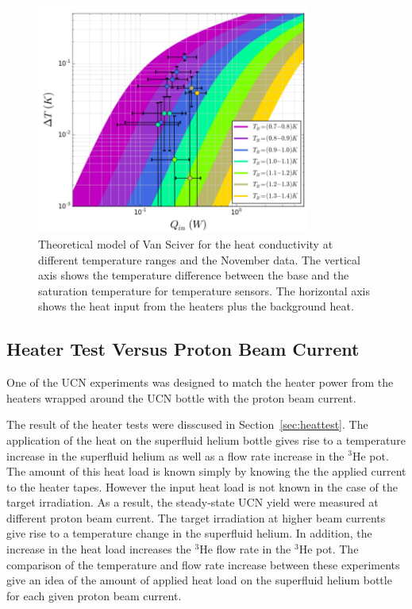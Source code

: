 \begin{figure}[h!]
  \centering \includegraphics[width=0.8\textwidth]{November_Data.png}
  \caption{Theoretical model of Van Sciver for the heat conductivity
    at different temperature ranges and the November data. The
    vertical axis shows the temperature difference between the base
    and the saturation temperature for temperature sensors. The
    horizontal axis shows the heat input from the heaters plus the
    background heat.}
\label{fig:November_Data}
\end{figure}

\subsection{Heater Test Versus Proton Beam Current}
One of the UCN experiments was designed to match the heater power from
the heaters wrapped around the UCN bottle with the proton beam
current.

The result of the heater tests were disscused in
Section~\ref{sec:heattest}. The application of the heat on the
superfluid helium bottle gives rise to a temperature increase in the
superfluid helium as well as a flow rate increase in the $^3$He
pot. The amount of this heat load is known simply by knowing the the
applied current to the heater tapes. However the input heat load is
not known in the case of the target irradiation. As a result, the
steady-state UCN yield were measured at different proton beam
current. The target irradiation at higher beam currents give rise to a
temperature change in the superfluid helium. In addition, the increase
in the heat load increases the $^3$He flow rate in the $^3$He pot.
The comparison of the temperature and flow rate increase between these
experiments give an idea of the amount of applied heat load on the
superfluid helium bottle for each given proton beam current.

